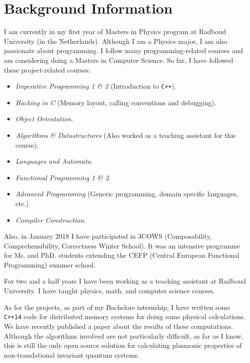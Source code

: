 \documentclass[a4paper,12pt]{article}
\begin{document}
\section*{Background Information}
    I am currently in my first year of Masters in Physics program at Radboud
    University (in the Netherlands). Although I am a Physics major, I am also
    passionate about programming. I follow many programming-related courses
    and am considering doing a Masters in Computer Science. So far, I have
    followed these project-related courses:
    \begin{itemize}
        \item \textit{Imperative Programming 1 \& 2} (Introduction to \texttt{C++}).
        \item \textit{Hacking in C} (Memory layout, calling conventions and
            debugging).
        \item \textit{Object Orientation}.
        \item \textit{Algorithms \& Datastructures} (Also worked as a teaching
            assistant for this course).
        \item \textit{Languages and Automata}.
        \item \textit{Functional Programming 1 \& 2}.
        \item \textit{Advanced Programming} (Generic programming, domain
            specific languages, etc.)
        \item \textit{Compiler Construction}.
    \end{itemize}

    Also, in January 2018 I have participated in 3COWS (Composability,
    Comprehensibility, Correctness Winter School). It was an intensive programme
    for Ms. and PhD. students extending the CEFP (Central European Functional
    Programming) summer school.

    For two and a half years I have been working as a teaching assistant at
    Radboud University. I have taught physics, math, and computer science
    courses.

    As for the projects, as part of my Bachelors internship\cite{bachelor2017},
    I have written some \texttt{C++14} code\cite{plasmon-cpp} for distributed
    memory systems for doing some physical calculations. We have recently
    published a paper\cite{westerhout2018plasmon} about the results of these
    computations. Although the algorithms involved are not particularly
    difficult, as far as I know, this is still the only open source solution for
    calculating plasmonic properties of non-translational invariant quantum
    systems.
\end{document}
